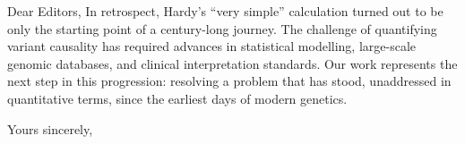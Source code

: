\documentclass[12pt,a4paper]{letter}
\begin{document}
\begin{letter}{Dear Editors,}
In retrospect, Hardy’s ``very simple'' calculation turned out to be only the starting point of a century-long journey. The challenge of quantifying variant causality has required advances in statistical modelling, large-scale genomic databases, and clinical interpretation standards. Our work represents the next step in this progression: resolving a problem that has stood, unaddressed in quantitative terms, since the earliest days of modern genetics.


\closing{Yours sincerely,}

\end{letter}
\end{document}
